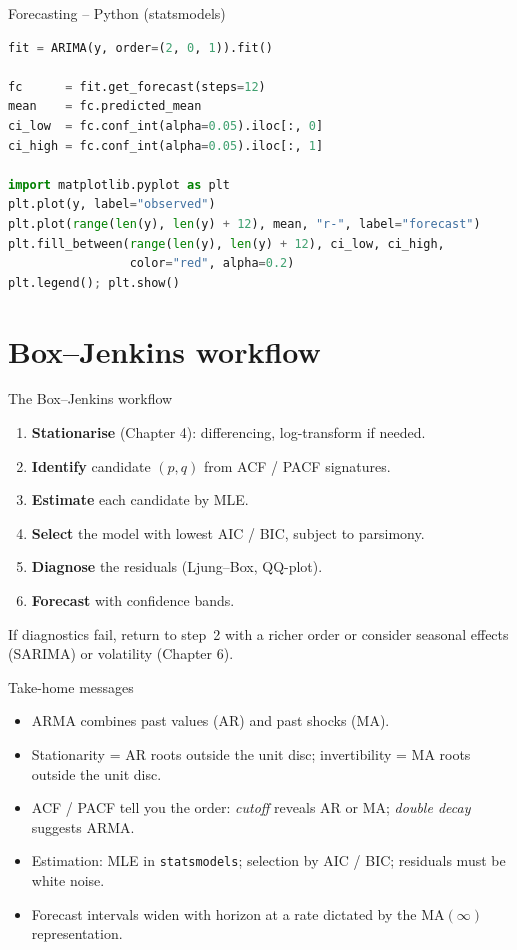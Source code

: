 \documentclass[aspectratio=169]{beamer}
\begin{document}
\begin{frame}[fragile]{Forecasting -- Python (statsmodels)}
\begin{lstlisting}[language=Python]
fit = ARIMA(y, order=(2, 0, 1)).fit()

fc      = fit.get_forecast(steps=12)
mean    = fc.predicted_mean
ci_low  = fc.conf_int(alpha=0.05).iloc[:, 0]
ci_high = fc.conf_int(alpha=0.05).iloc[:, 1]

import matplotlib.pyplot as plt
plt.plot(y, label="observed")
plt.plot(range(len(y), len(y) + 12), mean, "r-", label="forecast")
plt.fill_between(range(len(y), len(y) + 12), ci_low, ci_high,
                 color="red", alpha=0.2)
plt.legend(); plt.show()
\end{lstlisting}
\end{frame}

\section{Box--Jenkins workflow}

\begin{frame}{The Box--Jenkins workflow}
  \begin{enumerate}
    \item \textbf{Stationarise} (Chapter 4): differencing,
          log-transform if needed.
    \item \textbf{Identify} candidate $(p, q)$ from ACF / PACF
          signatures.
    \item \textbf{Estimate} each candidate by MLE.
    \item \textbf{Select} the model with lowest AIC / BIC, subject to
          parsimony.
    \item \textbf{Diagnose} the residuals (Ljung--Box, QQ-plot).
    \item \textbf{Forecast} with confidence bands.
  \end{enumerate}
  \pause
  \alert{If diagnostics fail}, return to step~2 with a richer order or
  consider seasonal effects (SARIMA) or volatility (Chapter 6).
\end{frame}

\begin{frame}{Take-home messages}
  \begin{itemize}
    \item ARMA combines past values (AR) and past shocks (MA).
    \item Stationarity = AR roots outside the unit disc;
          invertibility = MA roots outside the unit disc.
    \item ACF / PACF tell you the order: \emph{cutoff} reveals AR or
          MA; \emph{double decay} suggests ARMA.
    \item Estimation: MLE in \texttt{statsmodels}; selection by AIC /
          BIC; residuals must be white noise.
    \item Forecast intervals widen with horizon at a rate dictated
          by the MA$(\infty)$ representation.
  \end{itemize}
\end{frame}
\end{document}
